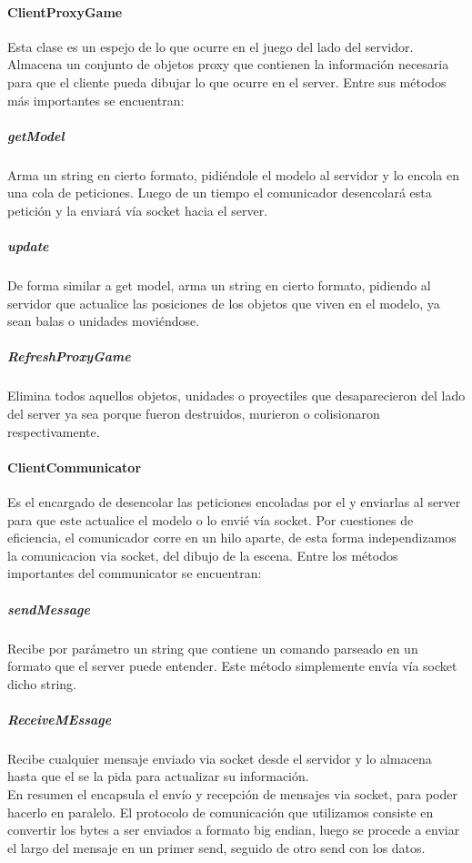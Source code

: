         \paragraph{ClientProxyGame}
            Esta clase es un espejo de lo que ocurre en el juego del lado del
            servidor. Almacena un conjunto de objetos proxy que contienen la
            información necesaria para que el cliente pueda dibujar lo que
            ocurre en el server. Entre sus métodos más importantes se encuentran:
            \subparagraph{getModel}
                Arma un string en cierto formato, pidiéndole el modelo al
                servidor y lo encola en una cola de peticiones. Luego de un
                tiempo el comunicador desencolará esta petición y la enviará
                vía socket hacia el server.
            \subparagraph{update}
                De forma similar a get model, arma un string en cierto formato,
                pidiendo al servidor que actualice las posiciones de los objetos
                que viven en el modelo, ya sean balas o unidades moviéndose.
            \subparagraph{RefreshProxyGame}
                Elimina todos aquellos objetos, unidades o proyectiles que
                desaparecieron del lado del server ya sea porque fueron
                destruidos, murieron o colisionaron respectivamente.
        \paragraph{ClientCommunicator}
            Es el encargado de desencolar las peticiones encoladas por el
             y enviarlas al server para que este actualice
            el modelo o lo envié vía socket. Por cuestiones de eficiencia, el
            comunicador corre en un hilo aparte, de esta forma independizamos la
            comunicacion via socket, del dibujo de la escena. Entre los métodos
            importantes del communicator se encuentran:
            \subparagraph{sendMessage}
                Recibe por parámetro un string que contiene un comando parseado
                en un formato que el server puede entender. Este método
                simplemente envía vía socket dicho string.
            \subparagraph{ReceiveMEssage}
                Recibe cualquier mensaje enviado via socket desde el servidor y
                lo almacena hasta que el  se la pida para
                actualizar su información.\\
                En resumen el  encapsula el envío y
                recepción de mensajes via socket, para poder hacerlo en paralelo.
                El protocolo de comunicación que utilizamos consiste en convertir
                los bytes a ser enviados a formato big endian, luego se procede a
                enviar el largo del mensaje en un primer send, seguido de otro send
                con los datos.
